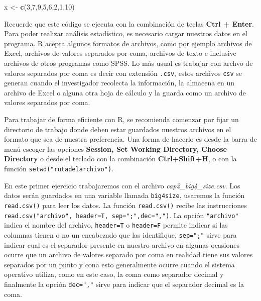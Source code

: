 \documentclass[]{book}
\newenvironment{Shaded}{\begin{snugshade}}{\end{snugshade}}
\newcommand{\DecValTok}[1]{\textcolor[rgb]{0.00,0.00,0.81}{#1}}
\newcommand{\KeywordTok}[1]{\textcolor[rgb]{0.13,0.29,0.53}{\textbf{#1}}}
\newcommand{\NormalTok}[1]{#1}
\newcommand{\StringTok}[1]{\textcolor[rgb]{0.31,0.60,0.02}{#1}}
\begin{document}
\begin{Shaded}
\begin{Highlighting}[]
\NormalTok{x <-}\StringTok{ }\KeywordTok{c}\NormalTok{(}\DecValTok{3}\NormalTok{,}\DecValTok{7}\NormalTok{,}\DecValTok{9}\NormalTok{,}\DecValTok{5}\NormalTok{,}\DecValTok{6}\NormalTok{,}\DecValTok{2}\NormalTok{,}\DecValTok{1}\NormalTok{,}\DecValTok{10}\NormalTok{) }
\end{Highlighting}
\end{Shaded}

Recuerde que este código se ejecuta con la combinación de teclas \textbf{Ctrl + Enter}. Para poder realizar análisis estadístico, es necesario cargar nuestros datos en el programa. R acepta algunos formatos de archivos, como por ejemplo archivos de Excel, archivos de valores separados por coma, archivos de texto e inclusive archivos de otros programas como SPSS. Lo más usual es trabajar con archvo de valores separados por coma es decir con extensión \texttt{.csv}, estos archivos \texttt{csv} se generan cuando el investigador recolecta la información, la almacena en un archivo de Excel o alguna otra hoja de cálculo y la guarda como un archivo de valores separados por coma.

Para trabajar de forma eficiente con R, se recomienda comenzar por fijar un directorio de trabajo donde deben estar guardados nuestros archivos en el formato que sea de nuestra preferencia. Una forma de hacerlo es desde la barra de menú escoger las opciones \textbf{Session, Set Working Directory, Choose Directory} o desde el teclado con la combinación \textbf{Ctrl+Shift+H}, o con la función \texttt{setwd("rutadelarchivo")}.

En este primer ejercicio trabajaremos con el archivo \emph{cap2\_big4\_size.csv}. Los datos serán guardados en una variable llamada \texttt{big4size}, usaremos la función \texttt{read.csv()} para leer los datos. La función \texttt{read.csv()} recibe las instrucciones \texttt{read.csv("archivo",\ header=T,\ sep=";",dec=",")}. La opción \texttt{"archivo"} indica el nombre del archivo, \texttt{header=T} o \texttt{header=F} permite indicar si las columnas tienen o no un encabezado que las identifique, \texttt{sep=";"} sirve para indicar cual es el separador presente en nuestro archivo en algunas ocasiones ocurre que un archivo de valores separado por coma en realidad tiene sus valores separados por un punto y cona esto generalmente ocurre cuando el sistema operativo utiliza, como en este caso, la coma como separador decimal y finalmente la opción \texttt{dec=","} sirve para indicar que el separador decimal es la coma.
\end{document}
